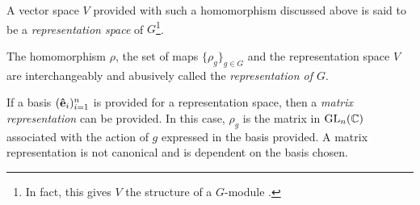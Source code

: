 \begin{notation}
	A vector space $V$ provided with such a homomorphism discussed above is said to be a \textit{representation space} of $G$\footnote{In fact, this gives $V$ the structure of a $G$-module \cite[1.3]{Sagan}.}.
\end{notation}

\begin{note}
	The homomorphism $\rho$, the set of maps $\{\rho_g\}_{g \in G}$ and the representation space $V$ are interchangeably and abusively called the \textit{representation of $G$}.
\end{note}


If a basis $(\mathbf{\hat{e}}_i)_{i=1}^n$ is provided for a representation space, then a \textit{matrix representation} can be provided. In this case, $\rho_g$ is the matrix in $\text{GL}_n(\mathbb{C})$ associated with the action of $g$ expressed in the basis provided. A matrix representation is not canonical and is dependent on the basis chosen.
